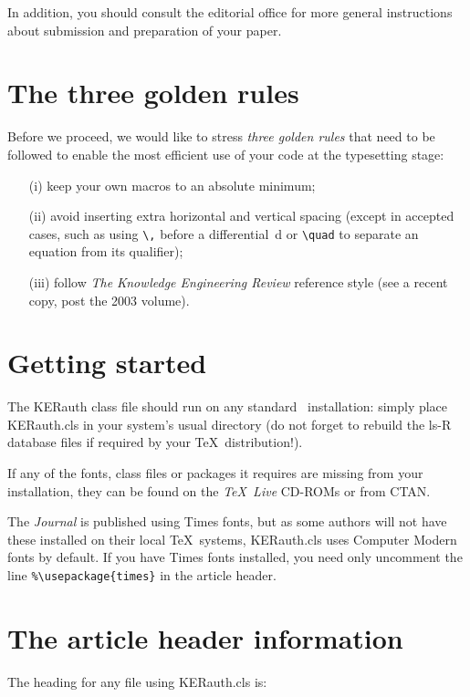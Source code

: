 \documentclass{KERauth}
\begin{document}
In addition, you should consult the editorial office for more general
instructions about submission and preparation of your paper.

\section{The three golden rules}
Before we proceed, we would like to stress \emph{three golden rules}
that need to be followed to enable the most efficient use of your code
at the typesetting stage:
\begin{enumerate}
\item[(i)] keep your own macros to an absolute minimum;
\item[(ii)] avoid inserting extra horizontal and vertical spacing (except in
accepted cases, such as using \verb"\," before a differential~d or \verb"\quad"
to separate an equation from its qualifier);
\item[(iii)] follow \emph{The Knowledge Engineering Review} reference
style (see a recent copy, post the 2003 volume).
\end{enumerate}

\section{Getting started}
The \textsf{KERauth} class file should run on any standard \LaTeXe\
installation: simply place \textsf{KERauth.cls} in your system's usual
directory (do not forget to rebuild the ls-R database files if
required by your \TeX\ distribution!).

If any of the fonts, class files or packages it requires are
missing from your installation, they can be found on the
\emph{\TeX\ Live} CD-ROMs or from CTAN.

The \emph{Journal} is published using Times fonts, but as some
authors will not have these installed on their local \TeX\
systems, \textsf{KERauth.cls} uses Computer Modern fonts by
default. If you have Times fonts installed, you need only
uncomment the line \verb"%\usepackage{times}"
in the article header.

\section{The article header information}
The heading for any file using \textsf{KERauth.cls} is:
\end{document}
